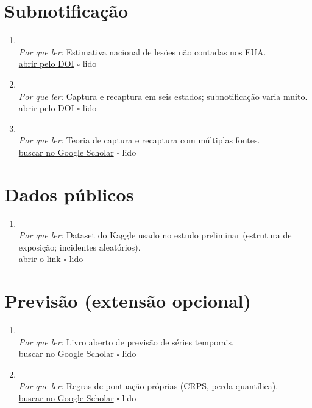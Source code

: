 \section{Subnotificação}
\begin{enumerate}[leftmargin=*]
  \item {}\\
  \textit{Por que ler:} Estimativa nacional de lesões não contadas nos EUA.\\
  \href{https://doi.org/10.1097/01.jom.0000105909.66435.53}{abrir pelo DOI} \hfill $\square$ \textsf{\small lido}
  \item {}\\
  \textit{Por que ler:} Captura e recaptura em seis estados; subnotificação varia muito.\\
  \href{https://doi.org/10.1016/j.annepidem.2007.11.003}{abrir pelo DOI} \hfill $\square$ \textsf{\small lido}
  \item {}\\
  \textit{Por que ler:} Teoria de captura e recaptura com múltiplas fontes.\\
  \href{https://scholar.google.com/scholar?q=Capture-recapture+and+multiple-record+systems+estimation+I\%3A+history+and+theoretical+development}{buscar no Google Scholar} \hfill $\square$ \textsf{\small lido}
\end{enumerate}

\section{Dados públicos}
\begin{enumerate}[leftmargin=*]
  \item {}\\
  \textit{Por que ler:} Dataset do Kaggle usado no estudo preliminar (estrutura de exposição; incidentes aleatórios).\\
  \href{https://www.kaggle.com/datasets/yogape/logistics-operations-database}{abrir o link} \hfill $\square$ \textsf{\small lido}
\end{enumerate}

\section{Previsão (extensão opcional)}
\begin{enumerate}[leftmargin=*]
  \item {}\\
  \textit{Por que ler:} Livro aberto de previsão de séries temporais.\\
  \href{https://scholar.google.com/scholar?q=Forecasting\%3A+Principles+and+Practice}{buscar no Google Scholar} \hfill $\square$ \textsf{\small lido}
  \item {}\\
  \textit{Por que ler:} Regras de pontuação próprias (CRPS, perda quantílica).\\
  \href{https://scholar.google.com/scholar?q=Strictly+proper+scoring+rules\%2C+prediction\%2C+and+estimation}{buscar no Google Scholar} \hfill $\square$ \textsf{\small lido}
\end{enumerate}

